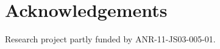 \documentclass{aes2e}
\begin{document}
\section{Acknowledgements}

Research project partly funded by ANR-11-JS03-005-01.



%
%
\end{document}

